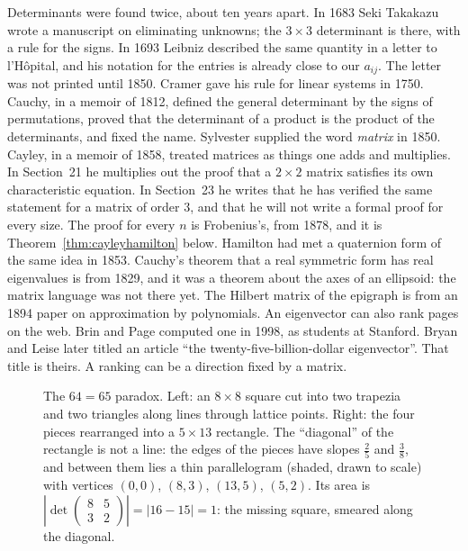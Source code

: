 Determinants were found twice, about ten years apart. In 1683 Seki Takakazu wrote a manuscript on eliminating unknowns; the $3\times3$ determinant is there, with a rule for the signs. In 1693 Leibniz described the same quantity in a letter to l'H\^opital, and his notation for the entries is already close to our $a_{ij}$. The letter was not printed until 1850. Cramer gave his rule for linear systems in 1750. Cauchy, in a memoir of 1812, defined the general determinant by the signs of permutations, proved that the determinant of a product is the product of the determinants, and fixed the name. Sylvester supplied the word \emph{matrix} in 1850. Cayley, in a memoir of 1858, treated matrices as things one adds and multiplies. In Section~21 he multiplies out the proof that a $2\times2$ matrix satisfies its own characteristic equation. In Section~23 he writes that he has verified the same statement for a matrix of order $3$, and that he will not write a formal proof for every size. The proof for every $n$ is Frobenius's, from 1878, and it is Theorem~\ref{thm:cayleyhamilton} below. Hamilton had met a quaternion form of the same idea in 1853. Cauchy's theorem that a real symmetric form has real eigenvalues is from 1829, and it was a theorem about the axes of an ellipsoid: the matrix language was not there yet. The Hilbert matrix of the epigraph is from an 1894 paper on approximation by polynomials. An eigenvector can also rank pages on the web. Brin and Page computed one in 1998, as students at Stanford. Bryan and Leise later titled an article ``the twenty-five-billion-dollar eigenvector''. That title is theirs. A ranking can be a direction fixed by a matrix.

\begin{figure}[ht]
\centering
{}
\caption{The $64=65$ paradox. Left: an $8\times8$ square cut into two trapezia and two triangles along lines through lattice points. Right: the four pieces rearranged into a $5\times13$ rectangle. The ``diagonal'' of the rectangle is not a line: the edges of the pieces have slopes $\frac25$ and $\frac38$, and between them lies a thin parallelogram (shaded, drawn to scale) with vertices $(0,0)$, $(8,3)$, $(13,5)$, $(5,2)$. Its area is $\left|\det\begin{pmatrix}8&5\\3&2\end{pmatrix}\right|=|16-15|=1$: the missing square, smeared along the diagonal.}
\label{fig:chessboard}
\end{figure}

